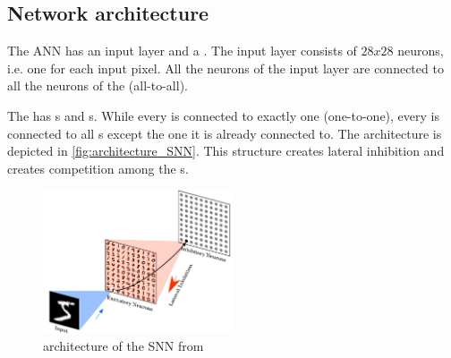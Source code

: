 \subsection{Network architecture}
\label{subsec:architecture}


The \ac{ANN} has an input layer and a \pLayer{} \cite{SNN}.
The input layer consists of $28 x 28$ neurons, i.e. one for each input pixel.
All the neurons of the input layer are connected to all the neurons of the \pLayer{} (all-to-all).

The \pLayer{} has \eN{}s and \iN{}s.
While every \eN{} is connected to exactly one \iN{} (one-to-one), every \iN{} is connected to all \eN{}s except the one it is already connected to.
The architecture is depicted in \autoref{fig:architecture_SNN}.
This structure creates lateral inhibition and creates competition among the \eN{}s.

\begin{figure}[htbp]
    \center
    \includegraphics[width=0.5\textwidth]{pictures/architecture_SNN_erste_Quelle.jpg}
    \caption{architecture of the \ac{SNN} from \cite{SNN}}
    \label{fig:architecture_SNN}
\end{figure}